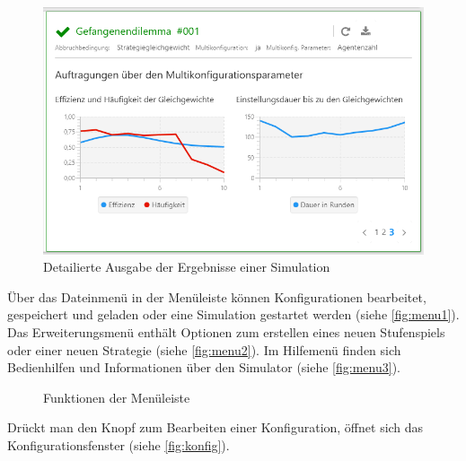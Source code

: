 \documentclass[parskip=full,11pt]{scrartcl}
\begin{document}
\begin{figure}[H]
	\centering
	\includegraphics[width=\textwidth]{images/home_out_3.png}
	\caption{\label{fig:home_out_3}
		Detailierte Ausgabe der Ergebnisse einer Simulation}
\end{figure}

Über das Dateinmenü in der Menüleiste können Konfigurationen bearbeitet, gespeichert und geladen oder eine Simulation gestartet werden (siehe \cref{fig:menu1}).
Das Erweiterungsmenü enthält Optionen zum erstellen eines neuen Stufenspiels oder einer neuen Strategie (siehe \cref{fig:menu2}). Im Hilfemenü finden sich Bedienhilfen und Informationen über den Simulator (siehe \cref{fig:menu3}).

\begin{figure}[ht]
	\centering
	\qquad
	\qquad
	\caption{\label{fig:menu}
		Funktionen der Menüleiste
	}
\end{figure}
\newpage
Drückt man den Knopf zum Bearbeiten einer Konfiguration, öffnet sich das Konfigurationsfenster (siehe \cref{fig:konfig}).
\end{document}
